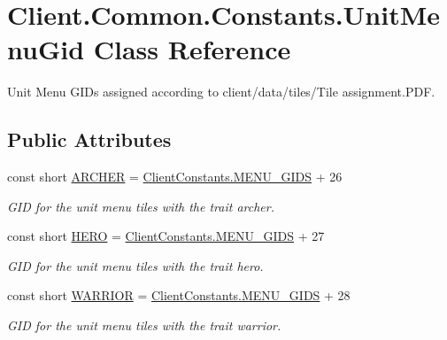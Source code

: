 \hypertarget{classClient_1_1Common_1_1Constants_1_1UnitMenuGid}{}\section{Client.\+Common.\+Constants.\+Unit\+Menu\+Gid Class Reference}
\label{classClient_1_1Common_1_1Constants_1_1UnitMenuGid}


Unit Menu G\+I\+Ds assigned according to \textquotesingle{}client/data/tiles/\+Tile assignment.\+P\+D\+F\textquotesingle{}.  


\subsection*{Public Attributes}
\begin{DoxyCompactItemize}
\item 
const short \hyperlink{classClient_1_1Common_1_1Constants_1_1UnitMenuGid_a818316b1993049515539c636aac7ad44}{A\+R\+C\+H\+E\+R} = \hyperlink{classClient_1_1Common_1_1Constants_1_1ClientConstants_a4d3b0e4f36481c991c9995cb20c9347d}{Client\+Constants.\+M\+E\+N\+U\+\_\+\+G\+I\+D\+S} + 26
\begin{DoxyCompactList}\small\item\em G\+I\+D for the unit menu tiles with the trait archer. \end{DoxyCompactList}\item 
const short \hyperlink{classClient_1_1Common_1_1Constants_1_1UnitMenuGid_a51edae59075cf42a87ff680c79d1d5cb}{H\+E\+R\+O} = \hyperlink{classClient_1_1Common_1_1Constants_1_1ClientConstants_a4d3b0e4f36481c991c9995cb20c9347d}{Client\+Constants.\+M\+E\+N\+U\+\_\+\+G\+I\+D\+S} + 27
\begin{DoxyCompactList}\small\item\em G\+I\+D for the unit menu tiles with the trait hero. \end{DoxyCompactList}\item 
const short \hyperlink{classClient_1_1Common_1_1Constants_1_1UnitMenuGid_afd701a2b6d3978be717ebae8353e0169}{W\+A\+R\+R\+I\+O\+R} = \hyperlink{classClient_1_1Common_1_1Constants_1_1ClientConstants_a4d3b0e4f36481c991c9995cb20c9347d}{Client\+Constants.\+M\+E\+N\+U\+\_\+\+G\+I\+D\+S} + 28
\begin{DoxyCompactList}\small\item\em G\+I\+D for the unit menu tiles with the trait warrior. \end{DoxyCompactList}\item 

\end{DoxyCompactItemize}
